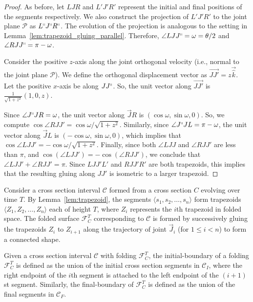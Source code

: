 \begin{proof}
As before, let $LJR$ and $L'J'R'$ represent the initial and final positions of the segments respectively.
We also construct the projection of $L'J'R'$ to the joint plane $\mathcal P$ as $L^\shortparallel J^\shortparallel R^\shortparallel$.
The evolution of the projection is analogous to the setting in Lemma~\ref{lem:trapezoid_gluing_parallel}.
Therefore, $\angle LJJ^\shortparallel = \omega = \theta/2$ and $\angle RJJ^\shortparallel = \pi-\omega$.

Consider the positive $z$-axis along the joint orthogonal velocity (i.e., normal to the joint plane $\mathcal P$).
We define the orthogonal displacement vector as $\overrightarrow{JJ'} = z\vec{\hat k}$.
Let the positive $x$-axis be along $JJ^\shortparallel$. So, the unit vector along $\overrightarrow{JJ'}$ is $\frac{1}{\sqrt{1+z^2}}(1,0,z)$.

Since $\angle J^\shortparallel JR = \omega$, the unit vector along $\overrightarrow JR$ is $(\cos\omega,\sin\omega,0)$.
So, we compute $\cos \angle RJJ' = \cos\omega/\sqrt{1+z^2}$.
Similarly, since $\angle J^\shortparallel JL = \pi-\omega$, the unit vector along $\overrightarrow JL$ is $(-\cos\omega,\sin\omega,0)$,
which implies that $\cos \angle LJJ' = -\cos\omega/\sqrt{1+z^2}$.
Finally, since both $\angle LJJ$ and $\angle RJJ'$ are less than $\pi$, and $\cos\left(\angle LJJ' \right) = -\cos\left(\angle RJJ' \right)$,
we conclude that $\angle LJJ' + \angle RJJ' = \pi$.
Since $LJJ'L'$ and $RJJ'R'$ are both trapezoids, this implies that the resulting gluing along $JJ'$ is isometric to a larger trapezoid.
\end{proof}

\begin{definition}
\label{def:interval_folding}
Consider a cross section interval $\mathcal C$ formed from a cross section $C$ evolving over time $T$.
By Lemma~\ref{lem:trapezoid}, the segments $ \langle s_1, s_2,\dots, s_n \rangle$ form trapezoids
$ \langle Z_1, Z_2,\dots, Z_n \rangle$ each of height $T$, where $Z_i$ represents the $i$th trapezoid in folded space.
The folded surface $\mathcal F_C^T$ corresponding to $\mathcal C$ is formed by successively gluing the trapezoids
$Z_i$ to $Z_{i+1}$ along the trajectory of joint $\vec J_i$ (for $1\le i<n$) to form a connected shape.
\end{definition}

\begin{definition}
\label{def:interval_folding_boundary}
Given a cross section interval $\mathcal C$ with folding $\mathcal F_C^T$,
the initial-boundary of a folding $\mathcal F_C^T$ is defined as the union of the initial cross section segments in $\mathcal C_I$,
where the right endpoint of the $i$th segment is attached to the left endpoint of the $(i+1)$st segment.
Similarly, the final-boundary of $\mathcal F_C^T$ is defined as the union of the final segments in $\mathcal C_F$.
\end{definition}

